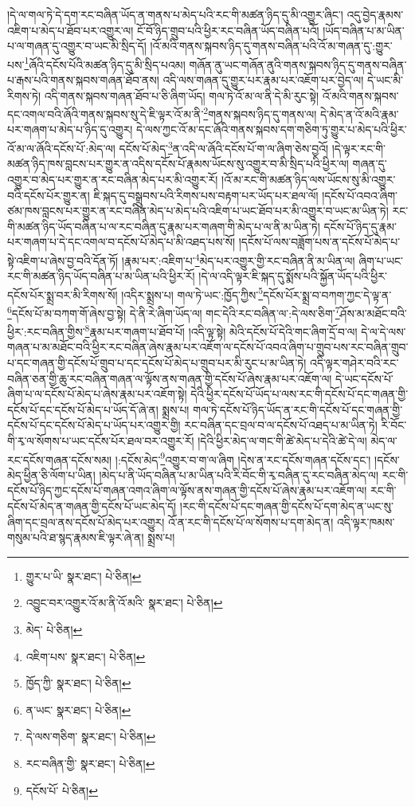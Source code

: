 །དེ་ལ་གལ་ཏེ་དེ་དག་རང་བཞིན་ཡོད་ན་གནས་པ་མེད་པའི་རང་གི་མཚན་ཉིད་དུ་མི་འགྱུར་ཞིང་། འདུ་བྱེད་རྣམས་འཇིག་པ་མེད་པ་ཐོབ་པར་འགྱུར་ལ། ངོ་བོ་ཉིད་གྲུབ་པའི་ཕྱིར་རང་བཞིན་ཡོད་བཞིན་པའོ། །ཡོད་བཞིན་པ་མ་ཡིན་པ་ལ་གཞན་དུ་འགྱུར་བ་ཡང་མི་སྲིད་དོ། །འོ་མའི་གནས་སྐབས་ཉིད་དུ་གནས་བཞིན་པའི་འོ་མ་གཞན་དུ་:གྱུར་པས་\footnote{གྱུར་པ་ཡི་  སྣར་ཐང་།  པེ་ཅིན། }ཞོའི་དངོས་པོའི་མཚན་ཉིད་དུ་མི་སྲིད་པའམ། གཞོན་ནུ་ཡང་གཞོན་ནུའི་གནས་སྐབས་ཉིད་དུ་གནས་བཞིན་པ་རྒས་པའི་གནས་སྐབས་གཞན་ཐོབ་ནས། འདི་ལས་གཞན་དུ་གྱུར་པར་རྣམ་པར་འཇོག་པར་བྱེད་ལ། དེ་ཡང་མི་རིགས་ཏེ། འདི་གནས་སྐབས་གཞན་ཐོབ་པ་ཅི་ཞིག་ཡོད། གལ་ཏེ་འོ་མ་ལ་ནི་དེ་མི་རུང་སྟེ། འོ་མའི་གནས་སྐབས་དང་འགལ་བའི་ཞོའི་གནས་སྐབས་སུ་དེ་ཇི་ལྟར་འོ་མ་ནི་\footnote{འབྱུང་བར་འགྱུར་འོ་མ་ནི་འོ་མའི་  སྣར་ཐང་།  པེ་ཅིན། }གནས་སྐབས་ཉིད་དུ་གནས་ལ། དེ་མེད་ན་འོ་མའི་རྣམ་པར་གཞག་པ་མེད་པ་ཉིད་དུ་འགྱུར། དེ་ལས་ཀྱང་འོ་མ་དང་ཞོའི་གནས་སྐབས་དག་གཅིག་ཏུ་གྱུར་པ་མེད་པའི་ཕྱིར་འོ་མ་ལ་ཞོའི་དངོས་པོ་:མེད་ལ། དངོས་པོ་མེད་\footnote{མེད་  པེ་ཅིན། }ན་འདི་ལ་ཞོའི་དངོས་པོ་ག་ལ་ཞིག་ཅེས་བྱའོ། །དེ་ལྟར་རང་གི་མཚན་ཉིད་ཁས་བླངས་པར་གྱུར་ན་འདིས་དངོས་པོ་རྣམས་ཡོངས་སུ་འགྱུར་བ་མི་སྲིད་པའི་ཕྱིར་ལ། གཞན་དུ་འགྱུར་བ་མེད་པར་གྱུར་ན་རང་བཞིན་མེད་པར་མི་འགྱུར་རོ། །འོ་མ་རང་གི་མཚན་ཉིད་ལས་ཡོངས་སུ་མི་འགྱུར་བའི་དངོས་པོར་གྱུར་ན། ཇི་སྐད་དུ་བསྒྲུབས་པའི་རིགས་པས་བརྟག་པར་ཡོད་པར་ཐལ་ལོ། །དངོས་པོ་འབའ་ཞིག་ཙམ་ཁས་བླངས་པར་གྱུར་ན་རང་བཞིན་མེད་པ་མེད་པའི་འཇིག་པ་ཡང་ཐོབ་པར་མི་འགྱུར་བ་ཡང་མ་ཡིན་ཏེ། རང་གི་མཚན་ཉིད་ཡོད་བཞིན་པ་ལ་རང་བཞིན་དུ་རྣམ་པར་གཞག་གི་མེད་པ་ལ་ནི་མ་ཡིན་ཏེ། དངོས་པོ་ཉིད་དུ་རྣམ་པར་གཞག་པ་དེ་དང་འགལ་བ་དངོས་པོ་མེད་པ་མི་འཐད་པས་སོ། །དངོས་པོ་ལས་བཟློག་པས་ན་དངོས་པོ་མེད་པ་སྟེ་འཇིག་པ་ཞེས་བྱ་བའི་དོན་ཏོ། །རྣམ་པར་:འཇིག་པ་\footnote{འཇིག་པས་  སྣར་ཐང་།  པེ་ཅིན། }མེད་པར་འགྱུར་གྱི་རང་བཞིན་ནི་མ་ཡིན་ལ། ཞིག་པ་ཡང་རང་གི་མཚན་ཉིད་ཡོད་བཞིན་པ་མ་ཡིན་པའི་ཕྱིར་རོ། །དེ་ལ་འདི་ལྟར་ཇི་སྐད་དུ་སྨོས་པའི་སྐྱོན་ཡོད་པའི་ཕྱིར་དངོས་པོར་སྨྲ་བར་མི་རིགས་སོ། །འདིར་སྨྲས་པ། གལ་ཏེ་ཡང་:ཁྱོད་ཀྱིས་\footnote{ཁྱོད་ཀྱི་  སྣར་ཐང་།  པེ་ཅིན། }དངོས་པོར་སྨྲ་བ་བཀག་ཀྱང་དེ་ལྟ་ན་\footnote{ན་ཡང་  སྣར་ཐང་།  པེ་ཅིན། }དངོས་པོ་མ་བཀག་གོ་ཞེས་བྱ་སྟེ། དེ་ནི་རེ་ཞིག་ཡོད་ལ། གང་དེའི་རང་བཞིན་ལ་:དེ་ལས་ཅིག་\footnote{དེ་ལས་གཅིག་  སྣར་ཐང་།  པེ་ཅིན། }ཤོས་མ་མཐོང་བའི་ཕྱིར་:རང་བཞིན་གྱིས་\footnote{རང་བཞིན་གྱི་  སྣར་ཐང་།  པེ་ཅིན། }རྣམ་པར་གཞག་པ་ཐོབ་པོ། །འདི་ལྟ་སྟེ། མེའི་དངོས་པོ་དེའི་གང་ཞིག་དྲོ་བ་ལ། དེ་ལ་དེ་ལས་གཞན་པ་མ་མཐོང་བའི་ཕྱིར་རང་བཞིན་ཞེས་རྣམ་པར་འཇོག་ལ་དངོས་པོ་འབའ་ཞིག་པ་གྲུབ་པས་རང་བཞིན་གྲུབ་པ་དང་གཞན་གྱི་དངོས་པོ་གྲུབ་པ་དང་དངོས་པོ་མེད་པ་གྲུབ་པར་མི་རུང་པ་མ་ཡིན་ཏེ། འདི་ལྟར་གཤེར་བའི་རང་བཞིན་ཅན་གྱི་ཆུ་རང་བཞིན་གཞན་ལ་ལྟོས་ནས་གཞན་གྱི་དངོས་པོ་ཞེས་རྣམ་པར་འཇོག་ལ། དེ་ཡང་དངོས་པོ་ཞིག་པ་ལ་དངོས་པོ་མེད་པ་ཞེས་རྣམ་པར་འཇོག་སྟེ། དེའི་ཕྱིར་དངོས་པོ་ཡོད་པ་ལས་རང་གི་དངོས་པོ་དང་གཞན་གྱི་དངོས་པོ་དང་དངོས་པོ་མེད་པ་ཡོད་དོ་ཞེ་ན། སྨྲས་པ། གལ་ཏེ་དངོས་པོ་ཉིད་ཡོད་ན་རང་གི་དངོས་པོ་དང་གཞན་གྱི་དངོས་པོ་དང་དངོས་པོ་མེད་པ་ཡོད་པར་འགྱུར་གྱི། རང་བཞིན་དང་བྲལ་བ་ལ་དངོས་པོ་འཐད་པ་མ་ཡིན་ཏེ། རི་བོང་གི་རྭ་ལ་སོགས་པ་ཡང་དངོས་པོར་ཐལ་བར་འགྱུར་རོ། །དེའི་ཕྱིར་མེད་ལ་གང་གི་ཚེ་མེད་པ་དེའི་ཚེ་དེ་ལ། མེད་ལ་རང་དངོས་གཞན་དངོས་སམ། །:དངོས་མེད་\footnote{དངོས་པོ་  པེ་ཅིན། }འགྱུར་བ་ག་ལ་ཞིག །དེས་ན་རང་དངོས་གཞན་དངོས་དང་། །དངོས་མེད་ཕྱིན་ཅི་ལོག་པ་ཡིན། །མེད་པ་ནི་ཡོད་བཞིན་པ་མ་ཡིན་པའི་རི་བོང་གི་རྭ་བཞིན་དུ་རང་བཞིན་མེད་ལ། རང་གི་དངོས་པོ་ཉིད་ཀྱང་དངོས་པོ་གཞན་འགའ་ཞིག་ལ་ལྟོས་ནས་གཞན་གྱི་དངོས་པོ་ཞེས་རྣམ་པར་འཇོག་ལ། རང་གི་དངོས་པོ་མེད་ན་གཞན་གྱི་དངོས་པོ་ཡང་མེད་དོ། །རང་གི་དངོས་པོ་དང་གཞན་གྱི་དངོས་པོ་དག་མེད་ན་ཡང་སུ་ཞིག་དང་བྲལ་ནས་དངོས་པོ་མེད་པར་འགྱུར། འོ་ན་རང་གི་དངོས་པོ་ལ་སོགས་པ་དག་མེད་ན། འདི་ལྟར་ཁམས་གསུམ་པའི་ཐ་སྙད་རྣམས་ཇི་ལྟར་ཞེ་ན། སྨྲས་པ། 